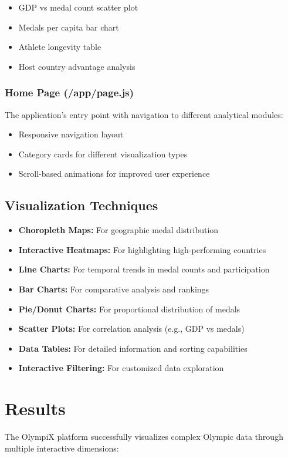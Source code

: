 \documentclass[a4paper, 12pt]{article}
\begin{document}
\begin{itemize}[leftmargin=*]
    \item GDP vs medal count scatter plot
    \item Medals per capita bar chart
    \item Athlete longevity table
    \item Host country advantage analysis
\end{itemize}

\subsubsection{Home Page (/app/page.js)}
The application's entry point with navigation to different analytical modules:

\begin{itemize}[leftmargin=*]
    \item Responsive navigation layout
    \item Category cards for different visualization types
    \item Scroll-based animations for improved user experience
\end{itemize}

\subsection{Visualization Techniques}
\begin{itemize}[leftmargin=*]
    \item \textbf{Choropleth Maps:} For geographic medal distribution
    \item \textbf{Interactive Heatmaps:} For highlighting high-performing countries
    \item \textbf{Line Charts:} For temporal trends in medal counts and participation
    \item \textbf{Bar Charts:} For comparative analysis and rankings
    \item \textbf{Pie/Donut Charts:} For proportional distribution of medals
    \item \textbf{Scatter Plots:} For correlation analysis (e.g., GDP vs medals)
    \item \textbf{Data Tables:} For detailed information and sorting capabilities
    \item \textbf{Interactive Filtering:} For customized data exploration
\end{itemize}

\section{Results}
The OlympiX platform successfully visualizes complex Olympic data through multiple interactive dimensions:
\end{document}
